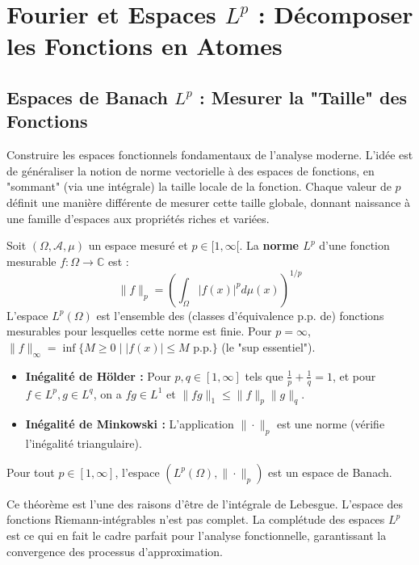 \chapter{Fourier et Espaces $L^p$ : Décomposer les Fonctions en Atomes}

\section{Espaces de Banach $L^p$ : Mesurer la "Taille" des Fonctions}

\begin{objectif}
    Construire les espaces fonctionnels fondamentaux de l'analyse moderne. L'idée est de généraliser la notion de norme vectorielle à des espaces de fonctions, en "sommant" (via une intégrale) la taille locale de la fonction. Chaque valeur de $p$ définit une manière différente de mesurer cette taille globale, donnant naissance à une famille d'espaces aux propriétés riches et variées.
\end{objectif}

\begin{definition}
    Soit $(\Omega, \mathcal{A}, \mu)$ un espace mesuré et $p \in [1, \infty[$. La \textbf{norme $L^p$} d'une fonction mesurable $f: \Omega \to \mathbb{C}$ est :
    $$ \|f\|_p = \left( \int_\Omega |f(x)|^p d\mu(x) \right)^{1/p} $$
    L'espace $L^p(\Omega)$ est l'ensemble des (classes d'équivalence p.p. de) fonctions mesurables pour lesquelles cette norme est finie.
    Pour $p=\infty$, $\|f\|_\infty = \inf \{ M \ge 0 \mid |f(x)| \le M \text{ p.p.}\}$ (le "sup essentiel").
\end{definition}

\begin{theorem}
    \begin{itemize}
        \item \textbf{Inégalité de Hölder :} Pour $p,q \in [1,\infty]$ tels que $\frac{1}{p}+\frac{1}{q}=1$, et pour $f \in L^p, g \in L^q$, on a $fg \in L^1$ et $\|fg\|_1 \le \|f\|_p \|g\|_q$.
        \item \textbf{Inégalité de Minkowski :} L'application $\|\cdot\|_p$ est une norme (vérifie l'inégalité triangulaire).
    \end{itemize}
\end{theorem}

\begin{theorem}
    Pour tout $p \in [1, \infty]$, l'espace $(L^p(\Omega), \|\cdot\|_p)$ est un espace de Banach.
\end{theorem}
\begin{remark}
    Ce théorème est l'une des raisons d'être de l'intégrale de Lebesgue. L'espace des fonctions Riemann-intégrables n'est pas complet. La complétude des espaces $L^p$ est ce qui en fait le cadre parfait pour l'analyse fonctionnelle, garantissant la convergence des processus d'approximation.
\end{remark}

